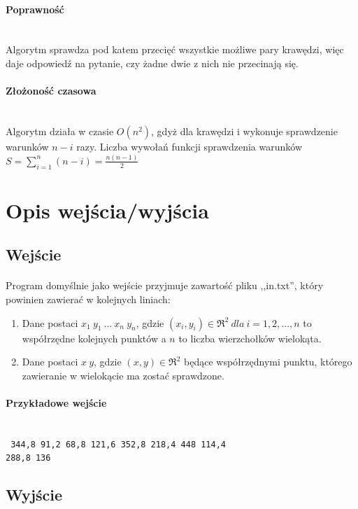 \documentclass{article}
\begin{document}
\paragraph{Poprawność} \mbox{}\\
Algorytm sprawdza pod katem przecięć wszystkie możliwe pary krawędzi, więc daje odpowiedź na pytanie, czy żadne dwie z nich nie przecinają się.

\paragraph{Złożoność czasowa} \mbox{}\\
Algorytm działa w czasie $O(n^2)$, gdyż dla krawędzi i wykonuje sprawdzenie warunków $n-i$ razy. Liczba wywołań funkcji sprawdzenia warunków $S = \sum\limits_{i=1}^n (n-i) = \frac{n(n-1)}{2}$

\section{Opis wejścia/wyjścia}

\subsection{Wejście}

\paragraph{}
Program domyślnie jako wejście przyjmuje zawartość pliku ,,in.txt'', który powinien zawierać w kolejnych liniach:
\begin{enumerate}
\item Dane postaci \(x_1\ y_1\ ...\ x_n\ y_n\), gdzie \((x_i,y_i) \in \Re^{2} \ dla\ i=1,2,...,n\) to współrzędne kolejnych punktów a \(n\) to liczba wierzchołków wielokąta.
\item Dane postaci \(x\ y\), gdzie \((x,y) \in \Re^{2}\) będące współrzędnymi punktu, którego zawieranie w wielokącie ma zostać sprawdzone.
\end{enumerate}

\paragraph{Przykładowe wejście} \mbox{}\\
\texttt{
344,8 91,2 68,8 121,6 352,8 218,4 448 114,4\\
288,8 136
}

\subsection{Wyjście}
\end{document}
